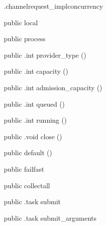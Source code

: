 \begin{CrexxClass}{.channelrequest\_impl}{concurrency}

  \begin{Hierarchy}
  \end{Hierarchy}

  \begin{Members}

    \Factory
      {public}
      {local}
      {}

    \Factory
      {public}
      {process}
      {}

    \Method
      {public}
      {.int}
      {provider\_type}
      {()}

    \Method
      {public}
      {.int}
      {capacity}
      {()}

    \Method
      {public}
      {.int}
      {admission\_capacity}
      {()}

    \Method
      {public}
      {.int}
      {queued}
      {()}

    \Method
      {public}
      {.int}
      {running}
      {()}

    \Method
      {public}
      {.void}
      {close}
      {()}

    \Factory
      {public}
      {default}
      {()}

    \Factory
      {public}
      {failfast}
      {}

    \Factory
      {public}
      {collectall}
      {}

    \Method
      {public}
      {.task}
      {submit}
      {}

    \Method
      {public}
      {.task}
      {submit\_arguments}
      {}


\end{Members}
\end{CrexxClass}
